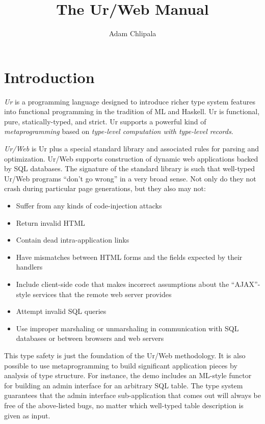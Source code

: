 \documentclass{article}
\begin{document}
\title{The Ur/Web Manual}
\author{Adam Chlipala}

\maketitle

\tableofcontents


\section{Introduction}

\emph{Ur} is a programming language designed to introduce richer type system features into functional programming in the tradition of ML and Haskell.  Ur is functional, pure, statically-typed, and strict.  Ur supports a powerful kind of \emph{metaprogramming} based on \emph{type-level computation with type-level records}.

\emph{Ur/Web} is Ur plus a special standard library and associated rules for parsing and optimization.  Ur/Web supports construction of dynamic web applications backed by SQL databases.  The signature of the standard library is such that well-typed Ur/Web programs ``don't go wrong'' in a very broad sense.  Not only do they not crash during particular page generations, but they also may not:

\begin{itemize}
\item Suffer from any kinds of code-injection attacks
\item Return invalid HTML
\item Contain dead intra-application links
\item Have mismatches between HTML forms and the fields expected by their handlers
\item Include client-side code that makes incorrect assumptions about the ``AJAX''-style services that the remote web server provides
\item Attempt invalid SQL queries
\item Use improper marshaling or unmarshaling in communication with SQL databases or between browsers and web servers
\end{itemize}

This type safety is just the foundation of the Ur/Web methodology.  It is also possible to use metaprogramming to build significant application pieces by analysis of type structure.  For instance, the demo includes an ML-style functor for building an admin interface for an arbitrary SQL table.  The type system guarantees that the admin interface sub-application that comes out will always be free of the above-listed bugs, no matter which well-typed table description is given as input.
\end{document}

